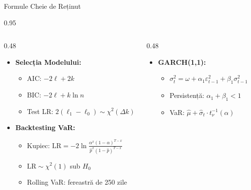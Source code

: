 \documentclass[9pt, aspectratio=169, t]{beamer}
\begin{document}
\begin{frame}{Formule Cheie de Reținut}
    \begin{cminipage}{0.95\textwidth}
    \begin{columns}[T]
        \begin{column}{0.48\textwidth}
            \begin{itemize}\setlength{\itemsep}{0pt}
                \item \textbf{Selecția Modelului:}
                \begin{itemize}\setlength{\itemsep}{0pt}
                    \item AIC: $-2\ell + 2k$
                    \item BIC: $-2\ell + k\ln n$
                    \item Test LR: $2(\ell_1 - \ell_0) \sim \chi^2(\Delta k)$
                \end{itemize}
            \end{itemize}

            \vspace{0.3cm}

            \begin{itemize}\setlength{\itemsep}{0pt}
                \item \textbf{Backtesting VaR:}
                \begin{itemize}\setlength{\itemsep}{0pt}
                    \item Kupiec: $\text{LR} = -2\ln\frac{\alpha^x(1-\alpha)^{T-x}}{\hat{p}^x(1-\hat{p})^{T-x}}$
                    \item $\text{LR} \sim \chi^2(1)$ sub $H_0$
                    \item Rolling VaR: fereastră de 250 zile
                \end{itemize}
            \end{itemize}
        \end{column}
        \begin{column}{0.48\textwidth}
            \begin{itemize}\setlength{\itemsep}{0pt}
                \item \textbf{GARCH(1,1):}
                \begin{itemize}\setlength{\itemsep}{0pt}
                    \item $\sigma_t^2 = \omega + \alpha_1\varepsilon_{t-1}^2 + \beta_1\sigma_{t-1}^2$
                    \item Persistență: $\alpha_1 + \beta_1 < 1$
                    \item VaR: $\hat{\mu} + \hat{\sigma}_t \cdot t_\nu^{-1}(\alpha)$
                \end{itemize}
            \end{itemize}


\end{column}
\end{columns}
\end{cminipage}
\end{frame}
\end{document}
